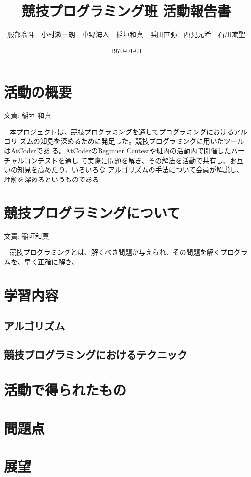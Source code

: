 \documentclass[11pt,a4paper]{jsarticle}
\title{競技プログラミング班 活動報告書}
\author{服部瑠斗　小村漱一朗　中野海人　稲垣和真　浜田直弥　西見元希　石川琉聖}
\date{\today}
\newcommand{\writtenBy}[1]{\begin{flushright}文責: #1\end{flushright}~}
\begin{document}
\maketitle
%
%
\section{活動の概要}
\writtenBy{稲垣 和真}
本プロジェクトは、競技プログラミングを通してプログラミングにおけるアルゴリ
ズムの知見を深めるために発足した。競技プログラミングに用いたツールはAtCoderであ
る。AtCoderのBeginner Contestや班内の活動内で開催したバーチャルコンテストを通し
て実際に問題を解き、その解法を活動で共有し、お互いの知見を高めたり、いろいろな
アルゴリズムの手法について会員が解説し、理解を深めるというものである

\section{競技プログラミングについて}
\writtenBy{稲垣和真}
競技プログラミングとは、解くべき問題が与えられ、その問題を解くプログラムを、早く正確に解き、
\section{学習内容}
\subsection{アルゴリズム}
\subsection{競技プログラミングにおけるテクニック}
\section{活動で得られたもの}
\section{問題点}
\section{展望}


%
%
\end{document}
